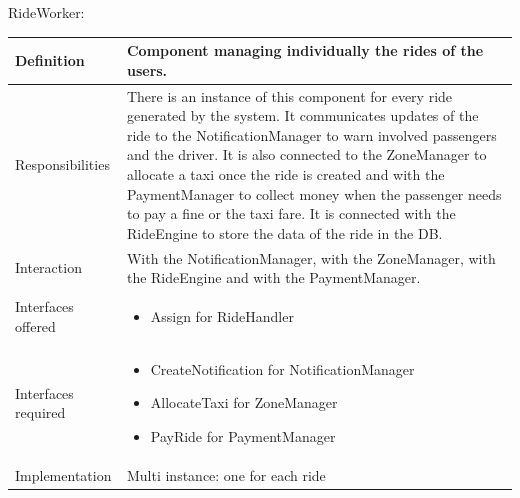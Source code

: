 \documentclass[a4paper,11pt]{report} %
\begin{document}
	\vspace*{0.35cm}
	\centerline{RideWorker:}
	\begin{center}
		\begin{tabular}{| l | p{9cm} |}\hline
			Definition & Component managing individually the rides of the users.\\\hline
			Responsibilities & There is an instance of this component for every ride generated by the system. It communicates updates of the ride to the NotificationManager to warn involved passengers and the driver. It is also connected to the ZoneManager to allocate a taxi once the ride is created and with the PaymentManager to collect money when the passenger needs to pay a fine or the taxi fare. It is connected with the RideEngine to store the data of the ride in the DB.\\\hline
			Interaction & With the NotificationManager, with the ZoneManager, with the RideEngine and with the PaymentManager.\\\hline
			Interfaces offered & \begin{itemize}
				\item Assign for RideHandler
			\end{itemize}\\\hline
			Interfaces required & \begin{itemize}
				\item CreateNotification for NotificationManager
				\item AllocateTaxi for ZoneManager
				\item PayRide for PaymentManager
			\end{itemize}\\\hline
			Implementation & Multi instance: one for each ride\\\hline
		\end{tabular}
	\end{center}	
	
	\pagebreak
\end{document}
